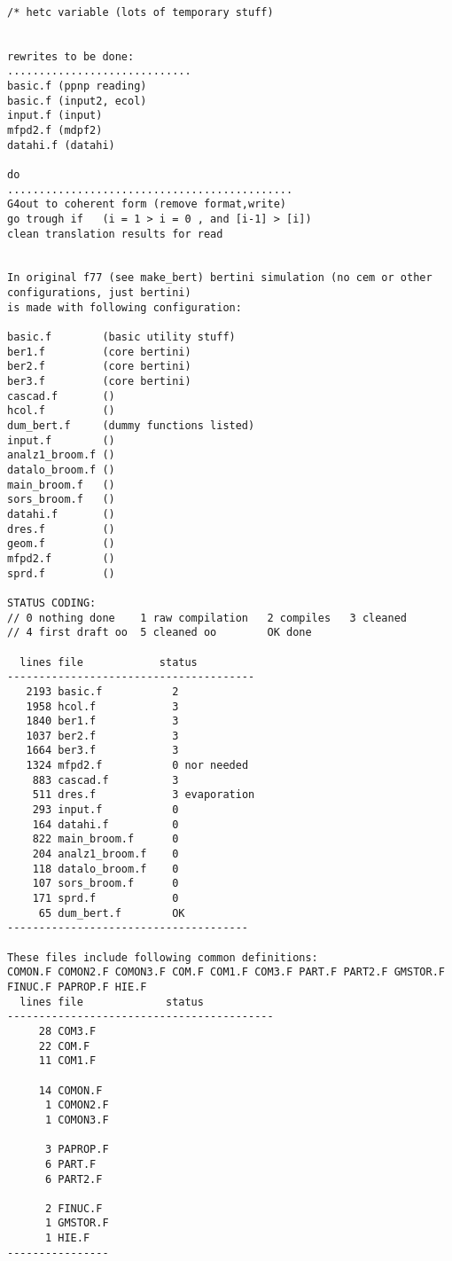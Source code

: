 \begin{verbatim}

/* hetc variable (lots of temporary stuff)


rewrites to be done: 
.............................
basic.f (ppnp reading)
basic.f (input2, ecol)
input.f (input)
mfpd2.f (mdpf2)
datahi.f (datahi)

do
.............................................
G4out to coherent form (remove format,write)
go trough if   (i = 1 > i = 0 , and [i-1] > [i])
clean translation results for read


In original f77 (see make_bert) bertini simulation (no cem or other configurations, just bertini)
is made with following configuration:

basic.f        (basic utility stuff)
ber1.f         (core bertini)
ber2.f         (core bertini)
ber3.f         (core bertini)
cascad.f       ()
hcol.f         ()
dum_bert.f     (dummy functions listed)
input.f        ()
analz1_broom.f ()
datalo_broom.f ()
main_broom.f   ()
sors_broom.f   ()  
datahi.f       ()
dres.f         ()
geom.f         ()
mfpd2.f        ()
sprd.f         ()

STATUS CODING: 
// 0 nothing done    1 raw compilation   2 compiles   3 cleaned
// 4 first draft oo  5 cleaned oo        OK done     

  lines file            status 
---------------------------------------
   2193 basic.f           2         
   1958 hcol.f            3
   1840 ber1.f            3
   1037 ber2.f            3
   1664 ber3.f            3
   1324 mfpd2.f           0 nor needed
    883 cascad.f          3
    511 dres.f            3 evaporation
    293 input.f           0
    164 datahi.f          0
    822 main_broom.f      0
    204 analz1_broom.f    0
    118 datalo_broom.f    0
    107 sors_broom.f      0
    171 sprd.f            0  
     65 dum_bert.f        OK              
--------------------------------------

These files include following common definitions:
COMON.F COMON2.F COMON3.F COM.F COM1.F COM3.F PART.F PART2.F GMSTOR.F FINUC.F PAPROP.F HIE.F  
  lines file             status
------------------------------------------
     28 COM3.F
     22 COM.F
     11 COM1.F

     14 COMON.F
      1 COMON2.F
      1 COMON3.F

      3 PAPROP.F
      6 PART.F
      6 PART2.F

      2 FINUC.F
      1 GMSTOR.F
      1 HIE.F
----------------


\end{verbatim}
